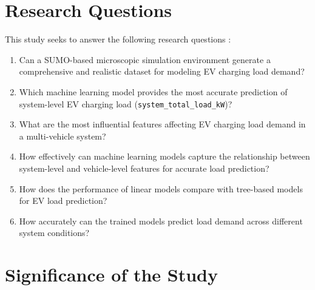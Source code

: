 \documentclass{thesis-library}
\begin{document}
\section{Research Questions}

This study seeks to answer the following research questions :

\begin{enumerate}
  \item Can a SUMO-based microscopic simulation environment generate a comprehensive and realistic dataset for modeling EV charging load demand?
  \item Which machine learning model provides the most accurate prediction of system-level EV charging load (\texttt{system\_total\_load\_kW})?
  \item What are the most influential features affecting EV charging load demand in a multi-vehicle system?
  \item How effectively can machine learning models capture the relationship between system-level and vehicle-level features for accurate load prediction?
  \item How does the performance of linear models compare with tree-based models for EV load prediction?
  \item How accurately can the trained models predict load demand across different system conditions?
\end{enumerate}

\section{Significance of the Study}
\end{document}
